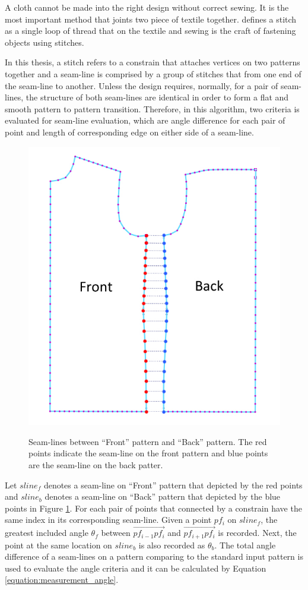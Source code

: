 A cloth cannot be made into the right design without correct sewing. It is the most important method that joints two piece of textile together.  defines a stitch as a single loop of thread that on the textile and sewing is the craft of fastening objects using stitches. 

In this thesis, a stitch refers to a constrain that attaches vertices on two patterns together and a seam-line is comprised by a group of stitches that from one end of the seam-line to another. Unless the design requires, normally, for a pair of seam-lines, the structure of both seam-lines are identical in order to form a flat and smooth pattern to pattern transition. Therefore, in this algorithm, two criteria is evaluated for seam-line evaluation, which are angle difference for each pair of point and length of corresponding edge on either side of a seam-line. 

\begin{figure}[H]
	\centering
	\includegraphics[width=0.7\columnwidth]{../images/seam_line}\\[0.1cm]
    \caption[A seam-line on patterns]{Seam-lines between ``Front'' pattern and ``Back'' pattern. The red points indicate the seam-line on the front pattern and blue points are the seam-line on the back patter.}
    \label{figure:seamline}
\end{figure}

Let $sline_{f}$ denotes a seam-line on ``Front'' pattern that depicted by the red points and $sline_{b}$ denotes a seam-line on ``Back'' pattern that depicted by the blue points in Figure \ref{figure:seamline}. For each pair of points that connected by a constrain have the same index in its corresponding seam-line. Given a point $pf_{i}$ on $sline_{f}$, the greatest included angle $\theta_{f}$ between $\overrightarrow{pf_{i-1}pf_{i}}$ and $\overrightarrow{pf_{i+1}pf_{i}}$ is recorded. Next, the point at the same location on $sline_{b}$ is also recorded as $\theta_{b}$. The total angle difference of a seam-lines on a pattern comparing to the standard input pattern is used to evaluate the angle criteria and it can be calculated by Equation \ref{equation:measurement_angle}.

